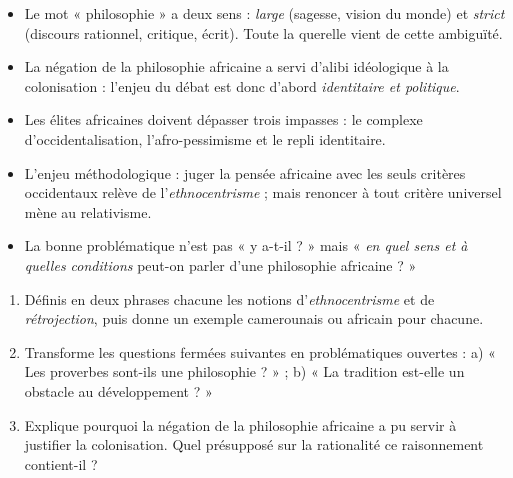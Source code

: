 \documentclass[11pt]{article}
\begin{document}
\begin{aretenir}
\begin{itemize}
\item Le mot « philosophie » a deux sens : \emph{large} (sagesse, vision du monde) et \emph{strict} (discours rationnel, critique, écrit). Toute la querelle vient de cette ambiguïté.
\item La négation de la philosophie africaine a servi d'alibi idéologique à la colonisation : l'enjeu du débat est donc d'abord \emph{identitaire et politique}.
\item Les élites africaines doivent dépasser trois impasses : le complexe d'occidentalisation, l'afro-pessimisme et le repli identitaire.
\item L'enjeu méthodologique : juger la pensée africaine avec les seuls critères occidentaux relève de l'\emph{ethnocentrisme} ; mais renoncer à tout critère universel mène au relativisme.
\item La bonne problématique n'est pas « y a-t-il ? » mais « \emph{en quel sens et à quelles conditions} peut-on parler d'une philosophie africaine ? »
\end{itemize}
\end{aretenir}

\begin{exercice}
\begin{enumerate}
\item Définis en deux phrases chacune les notions d'\emph{ethnocentrisme} et de \emph{rétrojection}, puis donne un exemple camerounais ou africain pour chacune.
\item Transforme les questions fermées suivantes en problématiques ouvertes : a) « Les proverbes sont-ils une philosophie ? » ; b) « La tradition est-elle un obstacle au développement ? »
\item Explique pourquoi la négation de la philosophie africaine a pu servir à justifier la colonisation. Quel présupposé sur la rationalité ce raisonnement contient-il ?
\end{enumerate}
\end{exercice}
\end{document}
